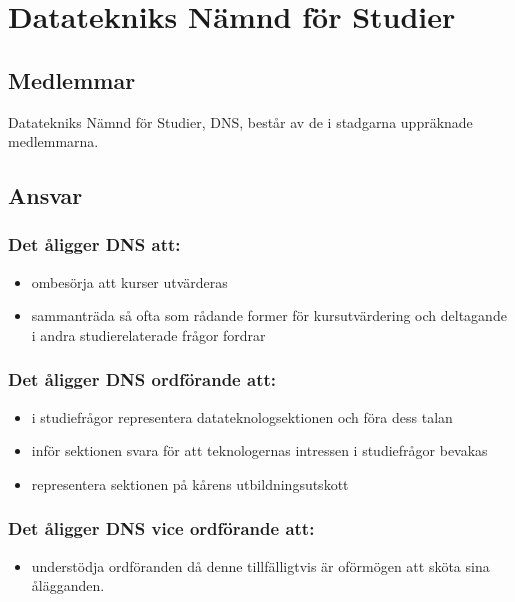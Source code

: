 \section{Datatekniks Nämnd för Studier}
\subsection{Medlemmar}
Datatekniks Nämnd för Studier, DNS, består av de i stadgarna uppräknade medlemmarna.
\subsection{Ansvar}
\subsubsection{Det åligger DNS att:}
\begin{itemize}
  \item ombesörja att kurser utvärderas
  \item sammanträda så ofta som rådande former för kursutvärdering och deltagande i andra studierelaterade frågor fordrar
\end{itemize}
\subsubsection{Det åligger DNS ordförande att:}
\begin{itemize}
  \item i studiefrågor representera datateknologsektionen och föra dess talan
  \item inför sektionen svara för att teknologernas intressen i studiefrågor bevakas
  \item representera sektionen på kårens utbildningsutskott
\end{itemize}
\subsubsection{Det åligger DNS vice ordförande att:}
\begin{itemize}
  \item understödja ordföranden då denne tillfälligtvis är oförmögen att sköta sina ålägganden.
\end{itemize}
\newpage
